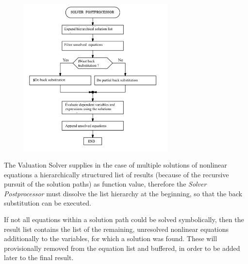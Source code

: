 \begin {figure} [htbp]
\begin {center}
\includegraphics[height=8cm]{PostProcEn.png}
\caption {}
\end {center}
\end {figure}


The Valuation Solver supplies in the case of multiple solutions of nonlinear equations a hierarchically structured list of results (because of the recursive pursuit of the solution paths) as function value, therefore  the {\em Solver Postprocessor} must dissolve  the list hierarchy at the beginning, so that the back substitution can be executed.

If not all equations within a solution path could be solved  symbolically, then the result list contains the list of the remaining, unresolved nonlinear equations additionally to the variables, for which a solution was found. These will provisionally removed from the equation list and buffered, in order to be added later to the final result.

